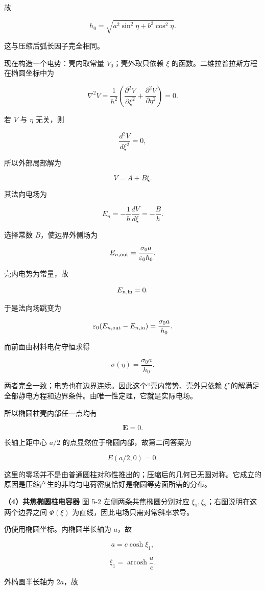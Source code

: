 \documentclass[12pt,a4paper,UTF8]{ctexart}
\begin{document}
故

\[h_0=\sqrt{a^2\sin^2\eta+b^2\cos^2\eta}.\]

这与压缩后弧长因子完全相同。

现在构造一个电势：壳内取常量 \(V_0\)；壳外取只依赖 \(\xi\)
的函数。二维拉普拉斯方程在椭圆坐标中为

\[\nabla^2V=\frac1{h^2}
\left(\frac{\partial^2V}{\partial\xi^2}
+\frac{\partial^2V}{\partial\eta^2}\right)=0.\]

若 \(V\) 与 \(\eta\) 无关，则

\[\frac{d^2V}{d\xi^2}=0,\]

所以外部局部解为

\[V=A+B\xi.\]

其法向电场为

\[E_n=-\frac1h\frac{dV}{d\xi}=-\frac Bh.\]

选择常数 \(B\)，使边界外侧场为

\[E_{n,\rm out}=\frac{\sigma_0a}{\varepsilon_0h_0}.\]

壳内电势为常量，故

\[E_{n,\rm in}=0.\]

于是法向场跳变为

\[\varepsilon_0(E_{n,\rm out}-E_{n,\rm in})
=\frac{\sigma_0a}{h_0}.\]

而前面由材料电荷守恒求得

\[\sigma(\eta)=\frac{\sigma_0a}{h_0}.\]

两者完全一致；电势也在边界连续。因此这个``壳内常势、壳外只依赖
\(\xi\)''的解满足全部静电方程和边界条件。由唯一性定理，它就是实际电场。

所以椭圆柱壳内部任一点均有

\[\boxed{\bm E=0}.\]

长轴上距中心 \(a/2\) 的点显然位于椭圆内部，故第二问答案为

\[\boxed{E(a/2,0)=0}.\]

这里的零场并不是由普通圆柱对称性推出的；压缩后的几何已无圆对称。它成立的原因是压缩产生的非均匀电荷密度恰好是椭圆等势面所需的分布。

\textbf{（4）共焦椭圆柱电容器} 图 5-2 左侧两条共焦椭圆分别对应
\(\xi_1,\xi_2\)；右图说明在这两个边界之间 \(\Phi(\xi)\)
为直线，因此电场只需对常斜率求导。

仍使用椭圆坐标。内椭圆半长轴为 \(a\)，故

\[a=c\cosh\xi_1,\]

\[\boxed{\xi_1=\operatorname{arcosh}\frac ac}.\]

外椭圆半长轴为 \(2a\)，故
\end{document}
